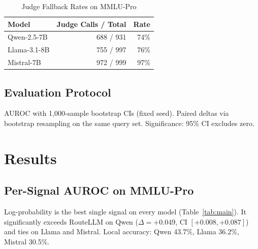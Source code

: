 \documentclass[journal]{IEEEtran}
\begin{document}
\begin{table}[t]
\centering
\caption{Judge Fallback Rates on MMLU-Pro}
\label{tab:judge}
\begin{tabular}{lrr}
\toprule
Model & Judge Calls / Total & Rate \\
\midrule
Qwen-2.5-7B & 688 / 931 & 74\% \\
Llama-3.1-8B & 755 / 997 & 76\% \\
Mistral-7B & 972 / 999 & 97\% \\
\bottomrule
\end{tabular}
\end{table}

\subsection{Evaluation Protocol}

AUROC with 1,000-sample bootstrap CIs (fixed seed). Paired deltas via bootstrap resampling on the same query set. Significance: 95\% CI excludes zero.


\section{Results}
\label{sec:results}

\subsection{Per-Signal AUROC on MMLU-Pro}

Log-probability is the best single signal on every model (Table~\ref{tab:main}). It significantly exceeds RouteLLM on Qwen ($\Delta = +0.049$, CI $[+0.008, +0.087]$) and ties on Llama and Mistral. Local accuracy: Qwen 43.7\%, Llama 36.2\%, Mistral 30.5\%.
\end{document}
